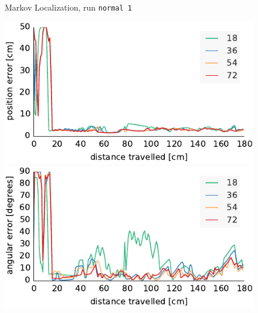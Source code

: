 \documentclass[letterpaper, 10pt, conference]{ieeeconf}
\begin{document}
\begin{figure}

\begin{center}
Markov Localization, run \texttt{normal 1}
\end{center}
\includegraphics{ml-whole_random_1-xy}\hfill
\includegraphics{ml-whole_random_1-theta}

\vspace{.5em}


\end{figure}
\end{document}
